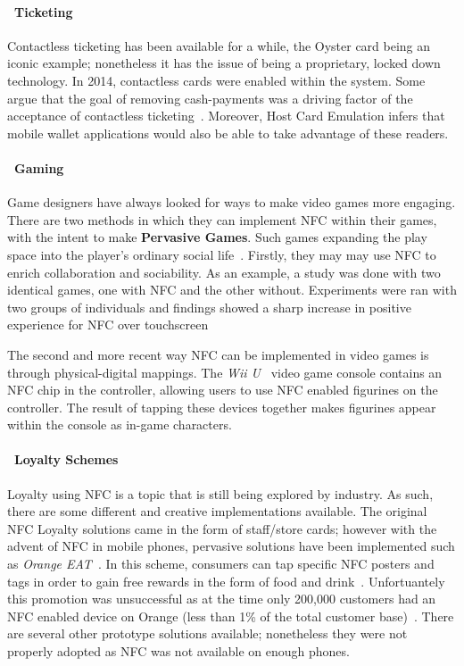 \paragraph{\textbullet~Ticketing}
Contactless ticketing has been available for a while, the Oyster card\cite{oystercosts} being an iconic example; nonetheless it has the issue of being a proprietary, locked down technology. In 2014, contactless cards were enabled within the system. Some argue that the goal of removing cash-payments was a driving factor of the acceptance of contactless ticketing~\cite{oystercosts}. Moreover, Host Card Emulation infers that mobile wallet applications would also be able to take advantage of these readers.
\paragraph{\textbullet~Gaming}
Game designers have always looked for ways to make video games more engaging. There are two methods in which they can implement NFC within their games, with the intent to make \textbf{Pervasive Games}. Such games expanding the play space into the player's ordinary social life~\cite{montola2005exploring}. Firstly, they may may use NFC to enrich collaboration and sociability. As an example, a study was done with two identical games, one with NFC and the other without\cite{wolbert2013evaluating}. Experiments were ran with two groups of individuals and findings showed a sharp increase in positive experience for NFC over touchscreen~\cite{wolbert2013evaluating} 

The second and more recent way NFC can be implemented in video games is through physical-digital mappings. The \emph{Wii U}~\cite{nintendo} video game console contains an NFC chip in the controller, allowing users to use NFC enabled figurines on the controller. The result of tapping these devices together makes figurines appear within the console as in-game characters. 

\paragraph{\textbullet~Loyalty Schemes}
Loyalty using NFC is a topic that is still being explored by industry. As such, there are some different and creative implementations available. The original NFC Loyalty solutions came in the form of staff/store cards; however with the advent of NFC in mobile phones, pervasive solutions have been implemented such as \emph{Orange EAT}~\cite{orangeEat}.  In this scheme, consumers can tap specific NFC posters and tags in order to gain free rewards in the form of food and drink~\cite{orange}. Unfortuantely this promotion was unsuccessful as at the time only 200,000 customers had an NFC enabled device on Orange (less than 1\% of the total customer base)~\cite{orange}. There are several other prototype solutions available; nonetheless they were not properly adopted as NFC was not available on enough phones.
\clearpage{}
